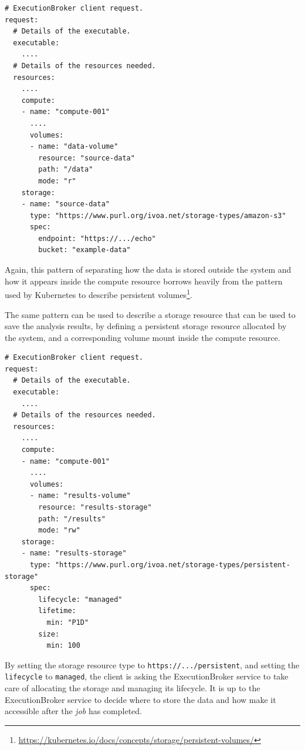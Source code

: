 \documentclass[11pt,a4paper]{ivoa}
\newcommand{\execbrokerclass} {ExecutionBroker}
\newcommand{\kubernetes} {Kubernetes}
\newcommand{\codeword}[1] {\texttt{#1}}
\newcommand{\footurl}[1] {\footnote{\url{#1}}}
\newcommand{\job} {\textit{job}}
\begin{document}
\begin{lstlisting}[]
# ExecutionBroker client request.
request:
  # Details of the executable.
  executable:
    ....
  # Details of the resources needed.
  resources:
    ....
    compute:
    - name: "compute-001"
      ....
      volumes:
      - name: "data-volume"
        resource: "source-data"
        path: "/data"
        mode: "r"
    storage:
    - name: "source-data"
      type: "https://www.purl.org/ivoa.net/storage-types/amazon-s3"
      spec:
        endpoint: "https://.../echo"
        bucket: "example-data"
\end{lstlisting}

Again, this pattern of separating how the data is stored outside the system
and how it appears inside the compute resource borrows heavily from the
pattern used by \kubernetes{} to describe persistent
volumes\footurl{https://kubernetes.io/docs/concepts/storage/persistent-volumes/}.

The same pattern can be used to describe a storage resource that can be used
to save the analysis results, by defining a persistent storage resource
allocated by the system, and a corresponding volume mount inside the compute resource.

\begin{lstlisting}[]
# ExecutionBroker client request.
request:
  # Details of the executable.
  executable:
    ....
  # Details of the resources needed.
  resources:
    ....
    compute:
    - name: "compute-001"
      ....
      volumes:
      - name: "results-volume"
        resource: "results-storage"
        path: "/results"
        mode: "rw"
    storage:
    - name: "results-storage"
      type: "https://www.purl.org/ivoa.net/storage-types/persistent-storage"
      spec:
        lifecycle: "managed"
        lifetime:
          min: "P1D"
        size:
          min: 100
\end{lstlisting}

By setting the storage resource type to \codeword{https://.../persistent},
and setting the \codeword{lifecycle} to \codeword{managed},
the client is asking the \execbrokerclass{} service to take care of allocating
the storage and managing its lifecycle.
It is up to the \execbrokerclass{} service to decide where to store the data and
how make it accessible after the \job{} has completed.
\end{document}

